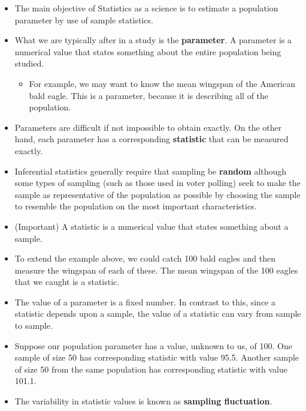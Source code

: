 \documentclass[a4paper,12pt]{article}
\begin{document}
\begin{itemize}
\item The main objective of Statistics as a science is to estimate a population parameter by use of sample statistics.

\item What we are typically after in a study is the \textbf{parameter}. A parameter is a numerical value that states something about the entire population being studied. 
\begin{itemize}
	\item For example, we may want to know the mean wingspan of the American bald eagle. This is a parameter, because it is describing all of the population.
\end{itemize}

\item Parameters are difficult if not impossible to obtain exactly. On the other hand, each parameter has a corresponding \textbf{statistic} that can be measured exactly. 
\item Inferential statistics generally require that sampling be \textbf{random} although some types of sampling (such as those used in voter polling) seek to make the sample as representative of the population as possible by choosing the sample to resemble the population on the most important characteristics.
\item (Important) A statistic is a numerical value that states something about a sample. 
\item To extend the example above, we could catch 100 bald eagles and then measure the wingspan of each of these. The mean wingspan of the 100 eagles that we caught is a statistic.

\item The value of a parameter is a fixed number. In contrast to this, since a statistic depends upon a sample, the value of a statistic can vary from sample to sample. 
\item Suppose our population parameter has a value, unknown to us, of 100. One sample of size 50 has corresponding statistic with value 95.5. Another sample of size 50 from the same population has corresponding statistic with value 101.1.
\item The variability in statistic values is known as \textbf{sampling fluctuation}.

\end{itemize}
\end{document}
